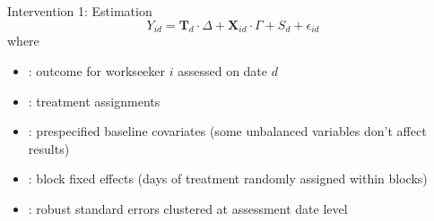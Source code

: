 \begin{frame}{Intervention 1: Estimation}
    $$
    Y_{id} = \mathbf{T}_d\cdot\Delta +\mathbf{X}_{id}\cdot\Gamma + S_d+\epsilon_{id}
    $$
    where
    \begin{itemize}
        \small
        \item[$\textcolor{fuzzywuzzy!65!white}{Y_{id}}$]: outcome for workseeker $i$ assessed on date $d$
        \item[$\textcolor{fuzzywuzzy!65!white}{\mathbf{T}_{d}}$]: treatment assignments
        \item[$\textcolor{fuzzywuzzy!65!white}{\mathbf{X}_{id}}$]: prespecified baseline covariates {\footnotesize(some unbalanced variables don't affect results)}
        \item[$\textcolor{fuzzywuzzy!65!white}{S_{d}}$]: block fixed effects {\footnotesize(days of treatment randomly assigned within blocks)} 
        \item[$\textcolor{fuzzywuzzy!65!white}{\epsilon_{id}}$]: robust standard errors clustered at assessment date level
    \end{itemize}
\end{frame}

